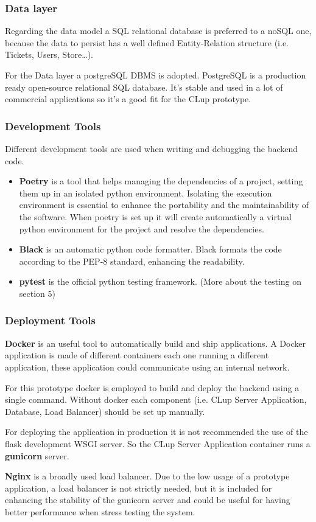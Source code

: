 \subsubsection{Data layer}
Regarding the data model a SQL relational database is preferred to a noSQL one, because the data to persist has a well defined Entity-Relation structure (i.e. Tickets, Users, Store\ldots).

For the Data layer a postgreSQL DBMS is adopted. PostgreSQL is a production ready open-source relational SQL database. It's stable and used in a lot of commercial applications so it's a good fit for the CLup prototype.

\subsubsection{Development Tools}
Different development tools are used when writing and debugging the backend code.
\begin{itemize}
    \item \textbf{Poetry} is a tool that helps managing the dependencies of a project, setting them up in an isolated python environment. Isolating the execution environment is essential to enhance the portability and the maintainability of the software. When poetry is set up it will create automatically a virtual python environment for the project and resolve the dependencies.
    \item \textbf{Black} is an automatic python code formatter. Black formats the code according to the PEP-8 standard, enhancing the readability.
    \item \textbf{pytest} is the official python testing framework. (More about the testing on section 5)
\end{itemize} 

\subsubsection{Deployment Tools}
\textbf{Docker} is an useful tool to automatically build and ship applications. A Docker application is made of different containers each one running a different application, these application could communicate using an internal network.

For this prototype docker is employed to build and deploy the backend using a single command. 
Without docker each component (i.e. CLup Server Application, Database, Load Balancer) should be set up manually.

\medskip

For deploying the application in production it is not recommended the use of the flask development WSGI server. So the CLup Server Application container runs a \textbf{gunicorn} server.

\medskip

\textbf{Nginx} is a broadly used load balancer. Due to the low usage of a prototype application, a load balancer is not strictly needed, but it is included for enhancing the stability of the gunicorn server and could be useful for having better performance when stress testing the system.